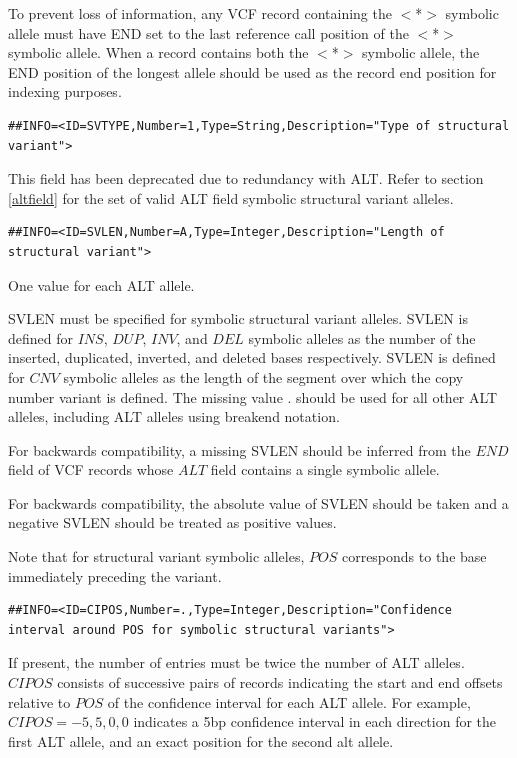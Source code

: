 \documentclass[8pt]{article}
\begin{document}
\begin{samepage}
To prevent loss of information, any VCF record containing the $<$*$>$ symbolic allele must have END set to the last reference call position of the $<$*$>$ symbolic allele.
When a record contains both the $<$*$>$ symbolic allele, the END position of the longest allele should be used as the record end position for indexing purposes.

\footnotesize
\begin{verbatim}
##INFO=<ID=SVTYPE,Number=1,Type=String,Description="Type of structural variant">
\end{verbatim}
\normalsize
\end{samepage}

This field has been deprecated due to redundancy with ALT.
Refer to section \ref{altfield} for the set of valid ALT field symbolic structural variant alleles.

\footnotesize
\begin{verbatim}
##INFO=<ID=SVLEN,Number=A,Type=Integer,Description="Length of structural variant">
\end{verbatim}
\normalsize

One value for each ALT allele.

SVLEN must be specified for symbolic structural variant alleles.
SVLEN is defined for $INS$, $DUP$, $INV$, and $DEL$ symbolic alleles as the number of the inserted, duplicated, inverted, and deleted bases respectively.
SVLEN is defined for $CNV$ symbolic alleles as the length of the segment over which the copy number variant is defined.
The missing value $.$ should be used for all other ALT alleles, including ALT alleles using breakend notation.

For backwards compatibility, a missing SVLEN should be inferred from the $END$ field of VCF records whose $ALT$ field contains a single symbolic allele.

For backwards compatibility, the absolute value of SVLEN should be taken and a negative SVLEN should be treated as positive values.

Note that for structural variant symbolic alleles, $POS$ corresponds to the base immediately preceding the variant.

\footnotesize
\begin{verbatim}
##INFO=<ID=CIPOS,Number=.,Type=Integer,Description="Confidence interval around POS for symbolic structural variants">
\end{verbatim}
\normalsize

If present, the number of entries must be twice the number of ALT alleles.
$CIPOS$ consists of successive pairs of records indicating the start and end offsets relative to $POS$ of the confidence interval for each ALT allele.
For example, $CIPOS=-5,5,0,0$ indicates a 5bp confidence interval in each direction for the first ALT allele, and an exact position for the second alt allele.
\end{document}
